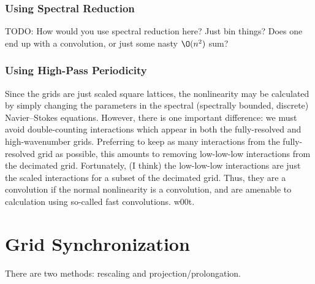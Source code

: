 \documentclass[10pt,showpacs,showkeys,%
amsfonts,amsmath,onecolumn,
floatfix,aps,superscriptaddress]{revtex4}
\begin{document}
\subsubsection{Using Spectral Reduction}

TODO: How would you use spectral reduction here?  Just bin things?
Does one end up with a convolution, or just some nasty $\O(n^2)$ sum?

\subsubsection{Using High-Pass Periodicity}

Since the grids are just scaled square lattices, the nonlinearity may
be calculated by simply changing the parameters in the spectral
(spectrally bounded, discrete) Navier--Stokes equations.  However,
there is one important difference: we must avoid double-counting
interactions which appear in both the fully-resolved and
high-wavenumber grids.  Preferring to keep as many interactions from
the fully-resolved grid as possible, this amounts to removing
low-low-low interactions from the decimated grid.  Fortunately, (I
think) the low-low-low interactions are just the scaled interactions
for a subset of the decimated grid.  Thus, they are a convolution if
the normal nonlinearity is a convolution, and are amenable to
calculation using so-called fast convolutions.  w00t.

\section{Grid Synchronization}

There are two methods: rescaling and  projection/prolongation.
\end{document}
